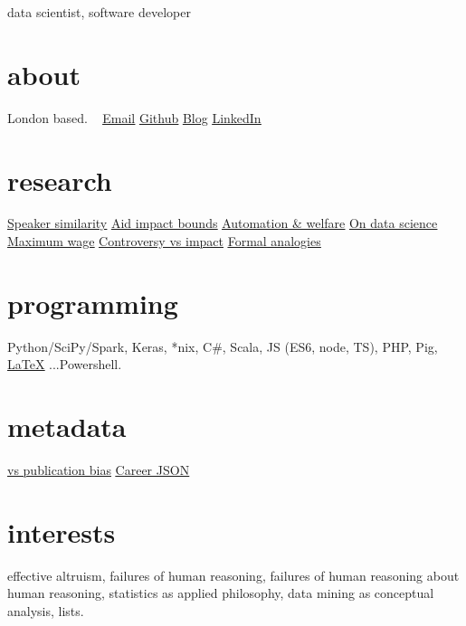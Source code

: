 \documentclass[]{friggeri-cv}
\makeatletter
\newcommand{\email}{\underline{\href{mailto:g@gleech.org}{Email}}}%
\newcommand{\linkedIn}{\underline{\href{https://linkedin.com/in/gleech}{LinkedIn}}}%
\newcommand{\github}{\underline{\href{https://github.com/g-leech}{Github}}}%
\newcommand{\newBlog}{\underline{\href{www.gleech.org}{Blog}}}%
\newcommand{\aidImpact}{\underline{\href{https://www.gleech.org/aid}{Aid impact bounds}}}%
\newcommand{\hmms}{\underline{\href{https://www.gleech.org/accommodation}{Speaker similarity}}}%
\newcommand{\analogies}{\underline{\href{https://www.gleech.org/conversion/}{Formal analogies}}}%
\newcommand{\nonvicious}{\underline{\href{https://www.gleech.org/automatic}{Automation \& welfare}}}%
\newcommand{\latex}{\underline{\href{https://www.gleech.org/cv.tex}{LaTeX}}}%
\newcommand{\livingWage}{\underline{\href{https://www.gleech.org/maximum}{Maximum wage}}}%
\newcommand{\dataScience}{\underline{\href{http://gleech.org/data-science}{On data science}}}%
\newcommand{\controversy}{\underline{\href{http://gleech.org/controversy}{Controversy vs impact}}}%
\newcommand{\odyssey}{\underline{\href{https://docs.google.com/spreadsheets/d/1eAe55oEzFhSFB5qNZYMzjSRLcJOW34_DxdAscXSu0AQ/edit?usp=sharing}{vs publication bias}}}%
\newcommand{\json}{\underline{\href{https://github.com/gavin-leech/MachineCV/blob/master/jobs_4_machines.json}{Career JSON}}}%
\newcommand{\iq}{\underline{\href{https://2.bp.blogspot.com/-T72346JIUhk/WKnGhDfOZTI/AAAAAAAAC2Q/08OJLVovi64flXyfz0RsSZ6mNsjSlvUCACLcB/s1600/2017-02-10-153628.jpg}{IQ: 99th percentile}}}
\makeatother
\begin{document}
%
       {data scientist, software developer} %
%
\begin{aside}
  \section{about}
    London based.
    ~
    \email{}
    \github{}
    \newBlog{}
    \linkedIn{}
  	~
  	~
  \section{research} 
	\hmms{}
  	\aidImpact{}
  	\nonvicious{}
    \dataScience{} 
  	\livingWage{}
    \controversy{}
   	\analogies{}
%
  ~
  ~
  \section{programming}
    Python/SciPy/Spark, Keras, *nix, C\#, Scala, JS (ES6, node, TS), PHP, Pig, \latex{} ...Powershell.
  ~
  ~
  \section{metadata}
    \odyssey{}
	\json{}
\end{aside}

\smallskip
\section{interests}

effective altruism, failures of human reasoning, failures of human reasoning about human reasoning, statistics as applied philosophy, data mining as conceptual analysis, lists.\\
%
\\
\end{document}
